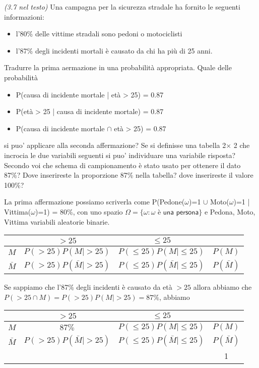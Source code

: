 \begin{exercise}{\emph{(3.7 nel testo)}}
  Una campagna per la sicurezza stradale ha fornito le seguenti
  informazioni:
  \begin{itemize}
  \item l'80\% delle vittime stradali sono pedoni o motociclisti
  \item l'87\% degli incidenti mortali \`e causato da chi ha pi\`u di
    25 anni.
  \end{itemize}
  Tradurre la prima aermazione in una probabilit\`a appropriata. Quale
  delle probabilit\`a
\begin{itemize}
\item P(causa di incidente mortale | et\`a > 25) = 0.87
\item P(et\`a > 25 | causa di incidente mortale) = 0.87
\item P(causa di incidente mortale $\cap$ et\`a > 25) = 0.87
\end{itemize}
si puo' applicare alla seconda affermazione?  Se si definisse una
tabella 2$\times$ 2 che incrocia le due variabili seguenti si puo'
individuare una variabile risposta? Secondo voi che schema di
campionamento \`e stato usato per ottenere il dato 87\%? Dove
inserireste la proporzione 87\% nella tabella? dove inserireste il
valore 100\%?
\end{exercise}
La prima affermazione possiamo scriverla come P(Pedone($\omega$)=1 $\cup$
Moto($\omega$)=1 | Vittima($\omega$)=1) = 80\%, con uno spazio $\Omega =
\{ \omega : \omega \textsf{ \`e una persona} \}$ e Pedona, Moto,
Vittima variabili aleatorie binarie.
  \begin{table}[h]              %
    \centering
    \begin{tabular}{|c|c|c|c|}
      \hline
      & $>25$ & $\leq 25$ &\\\hline
      $M$ & $P(>25)P(M| >25)$ & $P(\leq25)P(M|\leq25)$ & $P(M)$ \\
      $\bar{M}$ & $P(>25)P(\bar{M}| >25)$ & $P(\leq25)P(\bar{M}|\leq25)$ & $P(\bar{M})$ \\
      \hline
    \end{tabular}
  \end{table}
Se sappiamo che l'87\% degli incidenti \`e causato da et\`a $> 25$
allora abbiamo che $P(>25 \cap M) = P(>25)P(M| >25) = 87\%$, abbiamo
  \begin{table}[h]              %
    \centering
    \begin{tabular}{|c|c|c|c|}
      \hline
      & $>25$ & $\leq 25$ &\\\hline
      $M$ & $87\%$ & $P(\leq25)P(M|\leq25)$ & $P(M)$ \\
      $\bar{M}$ & $P(>25)P(\bar{M}| >25)$ &
      $P(\leq25)P(\bar{M}|\leq25)$ & $P(\bar{M})$ \\
      \hline
      & & & 1 \\
      \hline
    \end{tabular}
  \end{table}


